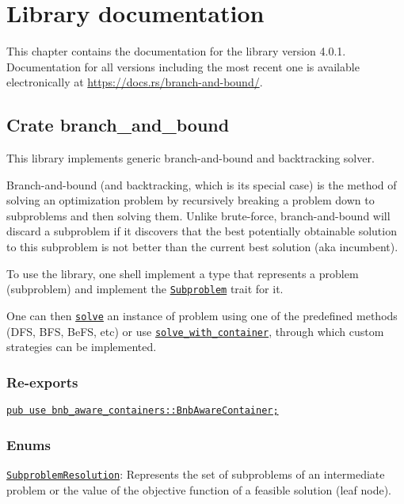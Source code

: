 \appendix

\chapter{Library documentation}
\label{appex:libdoc}

This chapter contains the documentation for the library version 4.0.1.
Documentation for all versions including the most recent one is available electronically at
\url{https://docs.rs/branch-and-bound/}.

\section*{Crate branch\_and\_bound}

This library implements generic branch-and-bound and backtracking solver.

Branch-and-bound (and backtracking, which is its special case) is the method of solving an optimization problem by recursively breaking a problem down to subproblems and then solving them. Unlike brute-force, branch-and-bound will discard a subproblem if it discovers that the best potentially obtainable solution to this subproblem is not better than the current best solution (aka incumbent).

To use the library, one shell implement a type that represents a problem (subproblem) and implement the \hyperlink{apx:Subproblem}{\texttt{Subproblem}} trait for it.

One can then \hyperlink{apx:solve}{\texttt{solve}} an instance of problem using one of the predefined methods (DFS, BFS, BeFS, etc) or use \hyperlink{apx:solve_with_container}{\texttt{solve\_with\_container}}, through which custom strategies can be implemented.

\subsection*{Re-exports}

\hyperlink{apx:BnbAwareContainer}{\texttt{pub use bnb\_aware\_containers::BnbAwareContainer;}}

\subsection*{Enums}

\hyperlink{apx:SubproblemResolution}{\texttt{SubproblemResolution}}: Represents the set of subproblems of an intermediate problem or the value of the objective function of a feasible solution (leaf node).

